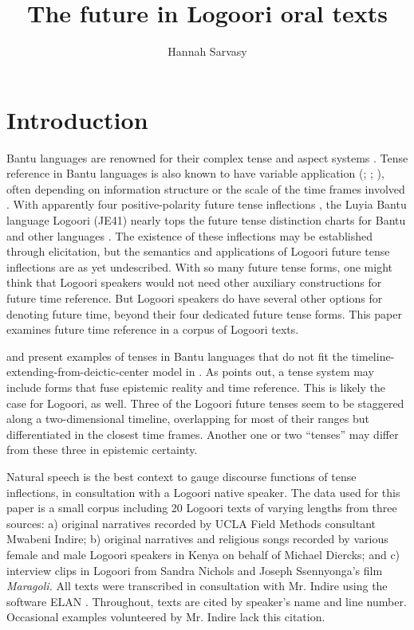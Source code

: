 \documentclass[output=paper]{langsci/langscibook}
\title{The future in Logoori oral texts}
\author{%
Hannah Sarvasy \affiliation{Australian National University} 
}
\begin{document}
\section{Introduction} \label{sec:sarvasy:1}

Bantu languages are renowned for their complex tense and aspect systems \citep{Nurse2003,Nurse2008}. Tense reference in Bantu languages is also known to have variable application (\citealt{Besha1989}{;} \citealt[101]{Nurse2003}{;} \citealt{Crane2011}), often depending on information structure or the scale of the time frames involved \citep{BotneKershner2008,Botne2013}. With apparently four positive-polarity future tense inflections \citep{Mould1981,Leung1991,Nurse2003}, the Luyia Bantu language Logoori (JE41) nearly tops the future tense distinction charts for Bantu and other languages \citep[89]{Nurse2008}. The existence of these inflections may be established through elicitation, but the semantics and applications of Logoori future tense inflections are as yet undescribed. With so many future tense forms, one might think that Logoori speakers would not need other auxiliary constructions for future time reference. But Logoori speakers do have several other options for denoting future time, beyond their four dedicated future tense forms. This paper examines future time reference in a corpus of Logoori texts.

\citet{BotneKershner2008} and \citet{Botne2013} present examples of tenses in Bantu languages that do not fit the timeline-extending-from-deictic-center model in \citet{Comrie1985}. As \citet{Botne2013} points out, a tense system may include forms that fuse epistemic reality and time reference. This is likely the case for Logoori, as well. Three of the Logoori future tenses seem to be staggered along a two-dimensional timeline, overlapping for most of their ranges but differentiated in the closest time frames. Another one or two “tenses” may differ from these three in epistemic certainty. 

Natural speech is the best context to gauge discourse functions of tense inflections, in consultation with a Logoori native speaker. The data used for this paper is a small corpus including 20 Logoori texts of varying lengths from three sources: a) original narratives recorded by UCLA Field Methods consultant Mwabeni Indire; b) original narratives and religious songs recorded by various female and male Logoori speakers in Kenya on behalf of Michael Diercks; and c) interview clips in Logoori from Sandra Nichols and Joseph Ssennyonga’s \citeyear{NicholsSsennyonga1976} film \textit{Maragoli. }All texts were transcribed in consultation with Mr. Indire using the software ELAN \citep{SloetjesWittenberg2008}. Throughout, texts are cited by speaker’s name and line number. Occasional examples volunteered by Mr. Indire lack this citation.
\end{document}
